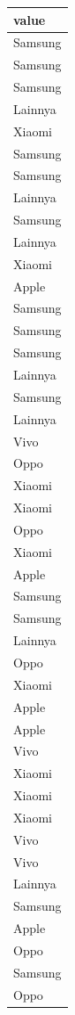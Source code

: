 \documentclass[
  letterpaper,
  DIV=11,
  numbers=noendperiod]{scrartcl}
\begin{document}
\begin{table}
\centering
\begin{tabular}[t]{l}
\hline
value\\
\hline
Samsung\\
\hline
Samsung\\
\hline
Samsung\\
\hline
Lainnya\\
\hline
Xiaomi\\
\hline
Samsung\\
\hline
Samsung\\
\hline
Lainnya\\
\hline
Samsung\\
\hline
Lainnya\\
\hline
Xiaomi\\
\hline
Apple\\
\hline
Samsung\\
\hline
Samsung\\
\hline
Samsung\\
\hline
Lainnya\\
\hline
Samsung\\
\hline
Lainnya\\
\hline
Vivo\\
\hline
Oppo\\
\hline
Xiaomi\\
\hline
Xiaomi\\
\hline
Oppo\\
\hline
Xiaomi\\
\hline
Apple\\
\hline
Samsung\\
\hline
Samsung\\
\hline
Lainnya\\
\hline
Oppo\\
\hline
Xiaomi\\
\hline
Apple\\
\hline
Apple\\
\hline
Vivo\\
\hline
Xiaomi\\
\hline
Xiaomi\\
\hline
Xiaomi\\
\hline
Vivo\\
\hline
Vivo\\
\hline
Lainnya\\
\hline
Samsung\\
\hline
Apple\\
\hline
Oppo\\
\hline
Samsung\\
\hline
Oppo\\

\end{tabular}
\end{table}
\end{document}
